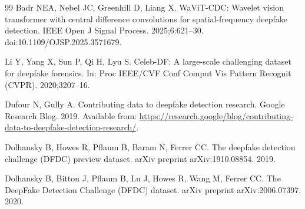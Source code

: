 \documentclass[fonts]{icst}
\begin{document}
\begin{thebibliography}{99}
Badr NEA, Nebel JC, Greenhill D, Liang X.
WaViT-CDC: Wavelet vision transformer with central difference convolutions for spatial-frequency deepfake detection.
IEEE Open J Signal Process. 2025;6:621--30. doi:10.1109/OJSP.2025.3571679.

Li Y, Yang X, Sun P, Qi H, Lyu S.
Celeb-DF: A large-scale challenging dataset for deepfake forensics.
In: Proc IEEE/CVF Conf Comput Vis Pattern Recognit (CVPR). 2020;3207--16.

Dufour N, Gully A.
Contributing data to deepfake detection research.
Google Research Blog. 2019. Available from: \url{https://research.google/blog/contributing-data-to-deepfake-detection-research/}.

Dolhansky B, Howes R, Pflaum B, Baram N, Ferrer CC.
The deepfake detection challenge (DFDC) preview dataset.
arXiv preprint arXiv:1910.08854. 2019.

Dolhansky B, Bitton J, Pflaum B, Lu J, Howes R, Wang M, Ferrer CC.
The DeepFake Detection Challenge (DFDC) dataset.
arXiv preprint arXiv:2006.07397. 2020.

\end{thebibliography}
\end{document}
